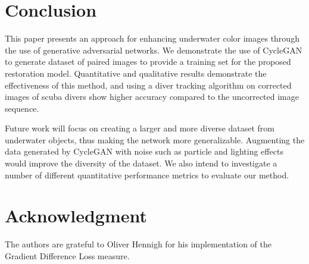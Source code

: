\section{Conclusion}
This paper presents an approach for enhancing underwater color images through the use of generative adversarial networks. We 
demonstrate the use of CycleGAN to generate dataset of paired images to provide a training set for the proposed restoration 
model. Quantitative and qualitative results demonstrate the effectiveness of this method, and using a diver tracking algorithm on 
corrected images of scuba divers show higher accuracy compared to the uncorrected image sequence.

Future work will focus on creating a larger and more diverse dataset from underwater objects, thus making the network more 
generalizable. Augmenting the data generated by CycleGAN with noise such as particle and lighting effects would improve 
the diversity of the dataset. We also intend to investigate a number of different quantitative performance metrics to evaluate 
our method.

\section*{Acknowledgment}
The authors are grateful to Oliver Hennigh for his implementation of the Gradient Difference Loss measure.